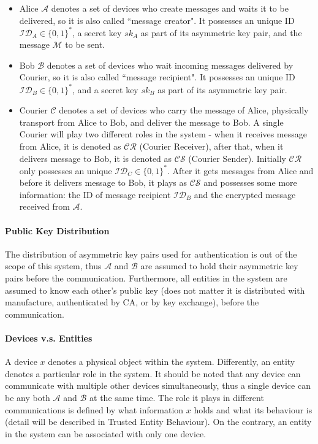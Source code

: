 \begin{itemize}
\item Alice $\mathcal{A}$ denotes a set of devices who create messages and waits it to be delivered, so it is also called ``message creator". It possesses an unique ID $\mathcal{ID}_A \in \{0, 1\}^*$, a secret key $sk_A$ as part of its asymmetric key pair, and the message $\mathcal{M}$ to be sent. \\

\item Bob $\mathcal{B}$ denotes a set of devices who wait incoming messages delivered by Courier, so it is also called ``message recipient". It possesses an unique ID $\mathcal{ID}_B \in \{0, 1\}^*$, and a secret key $sk_B$ as part of its asymmetric key pair.\\

\item Courier $\mathcal{C}$ denotes a set of devices who carry the message of Alice, physically transport from Alice to Bob, and deliver the message to Bob. A single Courier will play two different roles in the system - when it receives message from Alice, it is denoted as $\mathcal{CR}$ (Courier Receiver), after that, when it delivers message to Bob, it is denoted as $\mathcal{CS}$ (Courier Sender). Initially $ \mathcal{CR} $ only possesses an unique $\mathcal{ID}_C \in \{0, 1\}^*$. After it gets messages from Alice and before it delivers message to Bob, it plays as $\mathcal{CS}$ and possesses some more information: the ID of message recipient $ \mathcal{ID}_B $ and the encrypted message received from $\mathcal{A}$.
\end{itemize}

\paragraph{Public Key Distribution}
The distribution of asymmetric key pairs used for authentication is out of the scope of this system, thus $\mathcal{A}$ and $\mathcal{B}$ are assumed to hold their asymmetric key pairs before the communication. Furthermore, all entities in the system are assumed to know each other's public key (does not matter it is distributed with manufacture, authenticated by CA, or by key exchange), before the communication.

\paragraph{Devices v.s. Entities}
A device $x$ denotes a physical object within the system. Differently, an entity denotes a particular role in the system. It should be noted that any device can communicate with multiple other devices simultaneously, thus a single device can be any both $ \mathcal{A} $ and $ \mathcal{B} $ at the same time. The role it plays in different communications is defined by what information $x$ holds and what its behaviour is (detail will be described in Trusted Entity Behaviour). On the contrary, an entity in the system can be associated with only one device.

